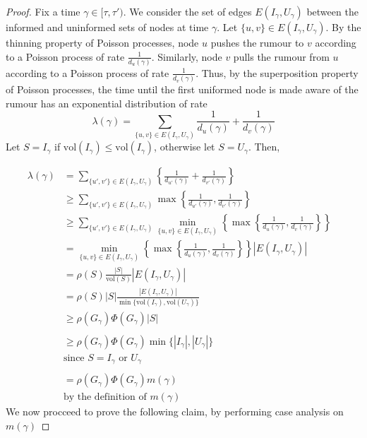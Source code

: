 \begin{proof}
	Fix a time $\gamma \in [\tau, \tau')$. 
	We consider the set of edges $E(I_\gamma, U_\gamma)$ between the informed and uninformed sets of nodes at time $\gamma$. 
	Let $\{u, v\} \in E(I_\gamma, U_\gamma)$. By the thinning property of Poisson processes, node $u$ pushes the rumour to $v$ according to a Poisson process of rate $\frac{1}{d_u(\gamma)}$. Similarly, node $v$ pulls the rumour from $u$ according to a Poisson process of rate $\frac{1}{d_v(\gamma)}$. %
	Thus, by the superposition property of Poisson processes, the time until the first uniformed node is made aware of the rumour has an exponential distribution of rate %
	$$
		\lambda(\gamma) = \sum_{\{u, v\} \in E(I_\gamma, U_\gamma)} \frac{1}{d_u(\gamma)} + \frac{1}{d_v(\gamma)}
	$$
	Let $S = I_\gamma$ if $\text{vol}(I_\gamma) \leq \text{vol}(I_\gamma)$, otherwise let $S = U_\gamma$. Then,

	\begin{align*}
		\lambda(\gamma) &= \sum_{\{u', v'\} \in E(I_\gamma, U_\gamma)} \left\{ \frac{1}{d_{u'}(\gamma)} + \frac{1}{d_{v'}(\gamma)} \right\}\\
		& \geq \sum_{\{u', v'\} \in E(I_\gamma, U_\gamma)}  \max \left\{ \frac{1}{d_{u'}(\gamma)},\frac{1}{d_{v'}(\gamma)} \right\} \\ 
		& \geq \sum_{\{u', v'\} \in E(I_\gamma, U_\gamma)} \min_{\{u, v\} \in E(I_\gamma, U_\gamma) } \left\{ \max \left\{ \frac{1}{d_u(\gamma)},\frac{1}{d_v(\gamma)} \right\} \right\} & \\ 
		& = \min_{\{u, v\} \in E(I_\gamma, U_\gamma) } 
		\left\{ \max \left\{ \frac{1}{d_u(\gamma)},\frac{1}{d_v(\gamma)} \right\} \right\} |E(I_\gamma, U_\gamma)| \\
		& = \rho(S) \frac{|S|}{\text{vol}(S)} |E(I_\gamma, U_\gamma)| \\
		& = \rho(S) |S| \frac{|E(I_\gamma, U_\gamma)|}{ 
			\min\{\text{vol}(I_\gamma), \text{vol}(U_\gamma)\}
		} \\
		& \geq \rho(G_\gamma)\Phi(G_\gamma)|S| \\ 
		& \\
		& \geq \rho(G_\gamma)\Phi(G_\gamma) \min\{|I_\gamma|, |U_\gamma|\} \\
		& \text{since } S = I_\gamma \text { or } U_\gamma \\
		& \\
		& = \rho(G_\gamma)\Phi(G_\gamma) m(\gamma) \\
		& \text{by the definition of } m(\gamma)
	\end{align*}
	We now procceed to prove the following claim, by performing case analysis on $m(\gamma)$


\end{proof}
